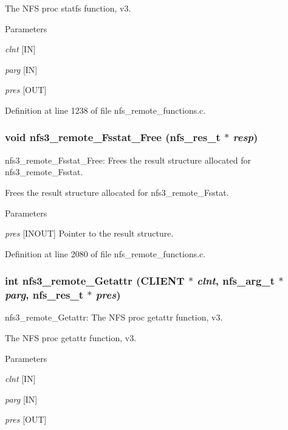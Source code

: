 The NFS proc statfs function, v3.


\begin{DoxyParams}{Parameters}
\item[{\em clnt}][IN] \item[{\em parg}][IN] \item[{\em pres}][OUT] \end{DoxyParams}


Definition at line 1238 of file nfs\_\-remote\_\-functions.c.
\subsubsection[{nfs3\_\-remote\_\-Fsstat\_\-Free}]{\setlength{\rightskip}{0pt plus 5cm}void nfs3\_\-remote\_\-Fsstat\_\-Free (nfs\_\-res\_\-t $\ast$ {\em resp})}\label{group__NFSprocs_ga166810381d038e556307172be9fdf2f7}
nfs3\_\-remote\_\-Fsstat\_\-Free: Frees the result structure allocated for nfs3\_\-remote\_\-Fsstat.

Frees the result structure allocated for nfs3\_\-remote\_\-Fsstat.


\begin{DoxyParams}{Parameters}
\item[{\em pres}][INOUT] Pointer to the result structure. \end{DoxyParams}


Definition at line 2080 of file nfs\_\-remote\_\-functions.c.
\subsubsection[{nfs3\_\-remote\_\-Getattr}]{\setlength{\rightskip}{0pt plus 5cm}int nfs3\_\-remote\_\-Getattr (CLIENT $\ast$ {\em clnt}, \/  nfs\_\-arg\_\-t $\ast$ {\em parg}, \/  nfs\_\-res\_\-t $\ast$ {\em pres})}\label{group__NFSprocs_ga49b3f4f38a6c16c3fc4386282205aac1}
nfs3\_\-remote\_\-Getattr: The NFS proc getattr function, v3.

The NFS proc getattr function, v3.


\begin{DoxyParams}{Parameters}
\item[{\em clnt}][IN] \item[{\em parg}][IN] \item[{\em pres}][OUT] \end{DoxyParams}


